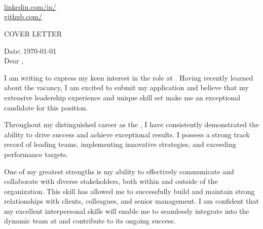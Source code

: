 \documentclass[11pt,a4]{article}
\begin{document}
\begin{center}
    \begin{minipage}[b]{0.24\textwidth}
            \large \phone \\
            \large \href{mailto:\email}{\email}
    \end{minipage}%
    \begin{minipage}[b]{0.5\textwidth}
            \centering
            {\Huge \name} \\ %
            \vspace{0.1cm}
            {\color{UI_blue} \Large{\currentjob}} \\
    \end{minipage}%
    \begin{minipage}[b]{0.24\textwidth}
            \flushright \large
            {\href{https://www.linkedin.com/in/\linkedin}{linkedin.com/in/\linkedin} } \\
            \href{https://https://github.com/\github}{github.com/\github}
    \end{minipage}

\vspace{-0.15cm}
{\color{UI_blue} \hrulefill}
\end{center}

\justify
\setlength{\parindent}{0pt}
\setlength{\parskip}{12pt}
\vspace{0.2cm}
\begin{center}
    {\color{UI_blue} \Large{COVER LETTER}}
\end{center}

Date: \today\\
Dear \recipient{},

I am writing to express my keen interest in the \position{} role at \company{}. Having recently learned about the vacancy, I am excited to submit my application and believe that my extensive leadership experience and unique skill set make me an exceptional candidate for this position.

Throughout my distinguished career as the \currentjob{}, I have consistently demonstrated the ability to drive success and achieve exceptional results. I possess a strong track record of leading teams, implementing innovative strategies, and exceeding performance targets.

One of my greatest strengths is my ability to effectively communicate and collaborate with diverse stakeholders, both within and outside of the organization. This skill has allowed me to successfully build and maintain strong relationships with clients, colleagues, and senior management. I am confident that my excellent interpersonal skills will enable me to seamlessly integrate into the dynamic team at \company{} and contribute to its ongoing success.
\end{document}

